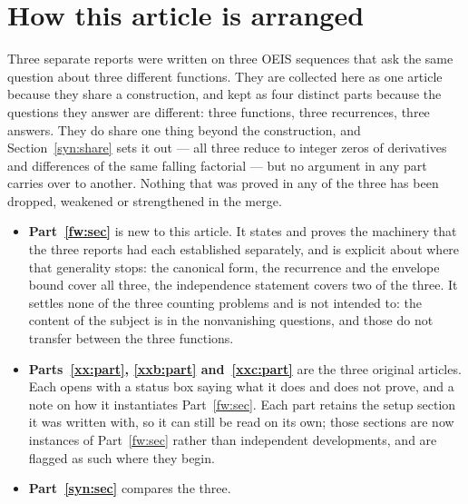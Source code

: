 \documentclass[11pt,a4paper]{article}
\numberwithin{equation}{section}
\theoremstyle{definition}
\theoremstyle{remark}
\theoremstyle{plain}
\begin{document}
\begin{abstract}
All computations reported here are exact.  Every modular certificate is
confirmed by exact integer arithmetic before a coefficient is declared to
vanish, so no claim rests on a probabilistic zero test; but every computation
certifies a finite range and none of them is an all-$n$ proof.
\end{abstract}

\setcounter{tocdepth}{2}
\tableofcontents
\clearpage

\section*{How this article is arranged}

Three separate reports were written on three OEIS sequences that ask the same
question about three different functions.  They are collected here as one
article because they share a construction, and kept as four distinct parts
because the questions they answer are different: three functions, three
recurrences, three answers.  They do share one thing beyond the construction,
and Section~\ref{syn:share} sets it out --- all three reduce to integer zeros of
derivatives and differences of the same falling factorial --- but no argument in
any part carries over to another.  Nothing that was proved in any of the three
has been dropped, weakened or strengthened in the merge.

\begin{itemize}[leftmargin=1.6em,itemsep=2pt]
\item \textbf{Part~\ref{fw:sec}} is new to this article.  It states and proves
 the machinery that the three reports had each established separately, and is
 explicit about where that generality stops: the canonical form, the recurrence
 and the envelope bound cover all three, the independence statement covers two
 of the three.  It settles none of the
 three counting problems and is not intended to: the content of the subject is
 in the nonvanishing questions, and those do not transfer between the three
 functions.
\item \textbf{Parts~\ref{xx:part}, \ref{xxb:part} and~\ref{xxc:part}} are the
 three original articles.  Each opens with a status box saying what it does and
 does not prove, and a note on how it instantiates Part~\ref{fw:sec}.  Each part
 retains the setup section it was written with, so it can still be read on its
 own; those sections are now instances of Part~\ref{fw:sec} rather than
 independent developments, and are flagged as such where they begin.
\item \textbf{Part~\ref{syn:sec}} compares the three.
\end{itemize}
\end{document}
